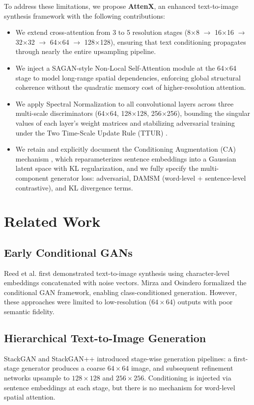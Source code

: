 \documentclass[conference]{IEEEtran}
\begin{document}
To address these limitations, we propose \textbf{AttenX}, an enhanced text-to-image synthesis framework with the following contributions:

\begin{itemize}
    \item We extend cross-attention from 3 to 5 resolution stages (8$\times$8 $\rightarrow$ 16$\times$16 $\rightarrow$ 32$\times$32 $\rightarrow$ 64$\times$64 $\rightarrow$ 128$\times$128), ensuring that text conditioning propagates through nearly the entire upsampling pipeline.
    \item We inject a SAGAN-style Non-Local Self-Attention module \cite{zhang2019self} at the 64$\times$64 stage to model long-range spatial dependencies, enforcing global structural coherence without the quadratic memory cost of higher-resolution attention.
    \item We apply Spectral Normalization \cite{miyato2018spectral} to all convolutional layers across three multi-scale discriminators (64$\times$64, 128$\times$128, 256$\times$256), bounding the singular values of each layer's weight matrices and stabilizing adversarial training under the Two Time-Scale Update Rule (TTUR) \cite{heusel2017gans}.
    \item We retain and explicitly document the Conditioning Augmentation (CA) mechanism \cite{xu2018attngan}, which reparameterizes sentence embeddings into a Gaussian latent space with KL regularization, and we fully specify the multi-component generator loss: adversarial, DAMSM (word-level + sentence-level contrastive), and KL divergence terms.
\end{itemize}

\section{Related Work}
\label{sec:related}

\subsection{Early Conditional GANs}
Reed et al. \cite{reed2016generative} first demonstrated text-to-image synthesis using character-level embeddings concatenated with noise vectors. Mirza and Osindero \cite{mirza2014conditional} formalized the conditional GAN framework, enabling class-conditioned generation. However, these approaches were limited to low-resolution ($64\times64$) outputs with poor semantic fidelity.

\subsection{Hierarchical Text-to-Image Generation}
StackGAN \cite{zhang2017stackgan} and StackGAN++ \cite{zhang2018stackgan++} introduced stage-wise generation pipelines: a first-stage generator produces a coarse $64\times64$ image, and subsequent refinement networks upsample to $128\times128$ and $256\times256$. Conditioning is injected via sentence embeddings at each stage, but there is no mechanism for word-level spatial attention.
\end{document}

